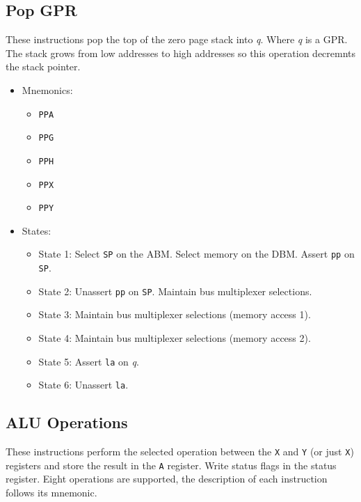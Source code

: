 \documentclass[a4paper,12pt]{article}
\newcommand{\Ar}{\texttt{A}}
\newcommand{\Xr}{\texttt{X}}
\newcommand{\Yr}{\texttt{Y}}
\newcommand{\SP}{\texttt{SP}}
\newcommand{\qq}{\textit{q}}
\begin{document}
\subsection{Pop GPR}
These instructions pop the top of the zero page stack into \qq{}. Where \qq{}
is a GPR. The stack grows from low addresses to high addresses so this 
operation decremnts the stack pointer.
\par

\begin{itemize}
\item Mnemonics:
\begin{itemize}
	\item \texttt{PPA}
	\item \texttt{PPG}
	\item \texttt{PPH}
	\item \texttt{PPX}
	\item \texttt{PPY}
\end{itemize}
\item States: 
\begin{itemize}
	\item State 1: Select \SP{} on the ABM. Select memory on the DBM.
	Assert \texttt{pp} on \SP{}.
	\item State 2: Unassert \texttt{pp} on \SP{}. Maintain bus multiplexer
	selections.
	\item State 3: Maintain bus multiplexer selections (memory access 1).
	\item State 4: Maintain bus multiplexer selections (memory access 2).
	\item State 5: Assert \texttt{la} on \qq{}.
	\item State 6: Unassert \texttt{la}.
\end{itemize}
\end{itemize}

\subsection{ALU Operations}
These instructions perform the selected operation between the \Xr{} and \Yr
(or just \Xr{}) registers and store the result in the \Ar{} register. Write
status flags in the status register. Eight operations are supported, the
description of each instruction follows its mnemonic.
\par
\end{document}
